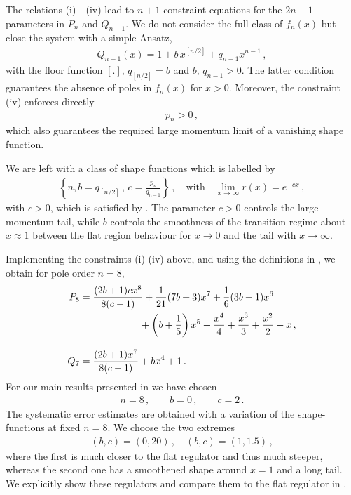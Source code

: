 \documentclass[aps,twocolumn,prd,superscriptaddress]{revtex4-2}
\begin{document}
The relations (i) - (iv) lead to $n+1$ constraint equations for the $2n - 1 $ parameters in $P_n$ and $Q_{n-1}$. We do not consider the full class of $f_n(x)$ but close the system with a simple Ansatz, 
%
\begin{align}
Q_{n-1}(x) = 1 + b\, x^{[n / 2]} + q_{n-1} x^{n-1}\,, 
\end{align}
%
with the floor function $[.]$, $q^{\ }_{[n/2]}=b$ and $b,\,q_{n-1} >0$. The latter condition guarantees the absence of poles in $f_n(x)$ for $x>0$. Moreover, the constraint (iv) enforces directly
%
	\begin{align} 
	p_n >0\,,
\label{eq:pn>0}
\end{align} 
%
which also guarantees the required large momentum limit of a vanishing shape function.

We are left with a class of shape functions which is labelled by 
%
	\begin{align}
	\left\{ n, b =q_{[n/2]}\,,\,c=	\frac{p_n}{q_{n-1}}\right\}\,, \quad \textrm{with}\quad \lim_{x\to \infty} r(x) = e^{-c x}\,, 
\label{eq:regcdef}
\end{align}
%
with $c>0$, which is satisfied by . 
The parameter $c>0$ controls the large momentum tail, while $b$ controls the smoothness of the transition regime about $x\approx 1$ between the flat region behaviour for $x\to 0 $ and the tail with $x\to \infty$.

Implementing the constraints (i)-(iv) above, and using the definitions in , we obtain for pole order $n=8$,
%
\begin{align}
	P_8 &= \frac{(2 b +1) c x^8}{8 (c-1)}+\frac{1}{21} (7 b+3) x^7+\frac{1}{6} (3 b+1) x^6 \notag\\&\hspace{2.14cm} +\left(b+\frac{1}{5}\right) x^5+\frac{x^4}{4}+\frac{x^3}{3}+\frac{x^2}{2}+x\,,
	\notag\\[2ex]
Q_7 &= {\frac{(2 b+1) x^7}{8 (c-1)}+b x^4+1}\,.
\end{align}
%
For our main results presented in  we have chosen 
%
\begin{align}
	n=8\,,\qquad b=0\,,\qquad c=2\,.
\label{eq:RegResults} 
\end{align}
%	
The systematic error estimates are obtained with a variation of the shape-functions at fixed $n=8$. We choose the two extremes
%
	\begin{align}
(b,c) =(0, 20)\,,\quad (b,c)= (1, 1.5)\,,
\end{align}
%
where the first is much closer to the flat regulator and thus much steeper, whereas the second one has a smoothened shape around $x=1$ and a long tail. We explicitly show these regulators and compare them to the flat regulator in .
\end{document}
